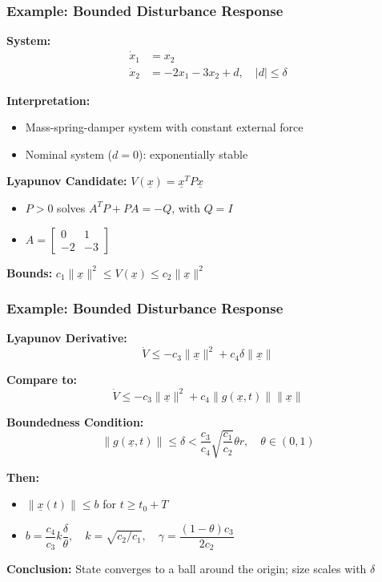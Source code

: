 \documentclass[student, noshadow, lsr, english, aspectratio=169, t]{ITR_LSR_slides}
\begin{document}
\begin{frame}
	\frametitle{Example: Bounded Disturbance Response}

	\textbf{System:}
	\begin{align*}
		\dot{x}_1 &= x_2 \\ %
		\dot{x}_2 &= -2x_1 - 3x_2 + d, \quad |d| \leq \delta %
	\end{align*}

	\textbf{Interpretation:}
	\begin{itemize}
		\item Mass-spring-damper system with constant external force
		\item Nominal system ($d = 0$): exponentially stable
	\end{itemize}

	\vspace{0.3em}

	\textbf{Lyapunov Candidate:} $V(\underline{x}) = \underline{x}^T P \underline{x}$

	\vspace{0.3em}
	\begin{itemize}
		\item $P > 0$ solves $A^T P + P A = -Q$, with $Q = I$
		\item $A = \begin{bmatrix} 0 & 1 \\ -2 & -3 \end{bmatrix}$
	\end{itemize}

	\vspace{0.3em}
	\textbf{Bounds:} \quad $c_1 \|\underline{x}\|^2 \leq V(\underline{x}) \leq c_2 \|\underline{x}\|^2$
\end{frame}


\begin{frame}
	\frametitle{Example: Bounded Disturbance Response}

	\textbf{Lyapunov Derivative:}
	\[
		\dot{V} \leq -c_3 \|\underline{x}\|^2 + c_4 \delta \|\underline{x}\|
	\]

	\textbf{Compare to:}
	\[
		\dot{V} \leq -c_3 \|\underline{x}\|^2 + c_4 \|g(\underline{x}, t)\| \|\underline{x}\|
	\]

	\textbf{Boundedness Condition:}
	\[
		\|g(\underline{x}, t)\| \leq \delta < \frac{c_3}{c_4} \sqrt{\frac{c_1}{c_2}} \theta r, \quad \theta \in (0,1)
	\]

	\vspace{0.3em}
	\textbf{Then:}
	\begin{itemize}
		\item $\|\underline{x}(t)\| \leq b$ for $t \geq t_0 + T$
		\item $b = \dfrac{c_4}{c_3} k \dfrac{\delta}{\theta}, \quad k = \sqrt{c_2/c_1}, \quad \gamma = \dfrac{(1 - \theta)c_3}{2c_2}$
	\end{itemize}

	\vspace{0.3em}
	\textbf{Conclusion:} State converges to a ball around the origin; size scales with $\delta$
\end{frame}
\end{document}

